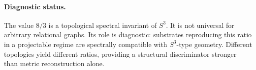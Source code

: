   \paragraph{Diagnostic status.}
    The value $8/3$ is a topological spectral invariant of $S^3$.
    It is not universal for arbitrary relational graphs.
    Its role is diagnostic: substrates reproducing this ratio
    in a projectable regime are spectrally compatible with
    $S^3$-type geometry.
    Different topologies yield different ratios, providing a
    structural discriminator stronger than metric reconstruction alone.
